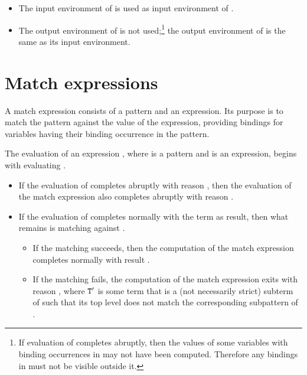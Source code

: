 \ENVIRONMENTS

\begin{itemize}
\item The input environment of  is used as input environment of .
\item The output environment of  is not used;\footnote{If evaluation of
 completes abruptly, then the values of some variables with binding occurrences
in  may not have been computed.  Therefore any bindings in
 must not be visible outside it.}
the output environment of  is the same as its input environment.
\end{itemize}

\section{Match expressions}

\label{section:match-expr}

A match expression consists of a pattern and an expression.  Its
purpose is to match the pattern against the value of the expression,
providing bindings for variables having their binding occurrence in
the pattern.

\SYNTAX

\begin{rules}
       { \TXT{=} \ifStd{}\fi\ifOld{}\fi \OR
        }
\end{rules}

\EVALUATION

The evaluation of an expression , where  is a
pattern and
 is an expression, begins with evaluating .
\begin{itemize}
\item If the evaluation of  completes
abruptly with reason , then the evaluation of the match expression also
completes abruptly with reason .
\item If the evaluation of  completes normally with the term
 as result, then what remains is matching  against .
\begin{itemize}
\item If the matching succeeds, then the computation of
the match expression completes normally with result .
\item If the matching fails, the computation of the
match expression exits with reason , where
${\tt{\sl T}}'$ is some term that is a (not necessarily strict) subterm of  such
that its top level does not match the corresponding subpattern of .
\end{itemize}
\end{itemize}

